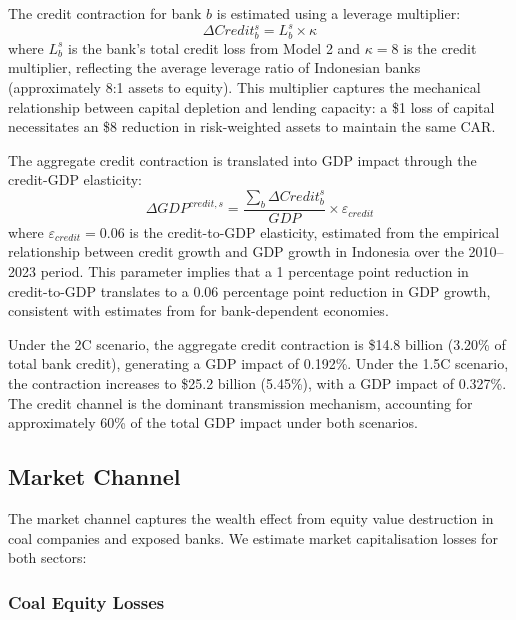 The credit contraction for bank $b$ is estimated using a leverage multiplier:
\begin{equation}
\label{eq:credit_contraction}
\Delta Credit_b^s = L_b^s \times \kappa
\end{equation}
where $L_b^s$ is the bank's total credit loss from Model 2 and $\kappa = 8$ is the credit multiplier, reflecting the average leverage ratio of Indonesian banks (approximately 8:1 assets to equity). This multiplier captures the mechanical relationship between capital depletion and lending capacity: a \$1 loss of capital necessitates an \$8 reduction in risk-weighted assets to maintain the same CAR.

The aggregate credit contraction is translated into GDP impact through the credit-GDP elasticity:
\begin{equation}
\label{eq:credit_gdp}
\Delta GDP^{credit,s} = \frac{\sum_b \Delta Credit_b^s}{GDP} \times \varepsilon_{credit}
\end{equation}
where $\varepsilon_{credit} = 0.06$ is the credit-to-GDP elasticity, estimated from the empirical relationship between credit growth and GDP growth in Indonesia over the 2010--2023 period. This parameter implies that a 1 percentage point reduction in credit-to-GDP translates to a 0.06 percentage point reduction in GDP growth, consistent with estimates from \citet{GambacortaMarques2011} for bank-dependent economies.

Under the 2\textdegree C scenario, the aggregate credit contraction is \$14.8 billion (3.20\% of total bank credit), generating a GDP impact of 0.192\%. Under the 1.5\textdegree C scenario, the contraction increases to \$25.2 billion (5.45\%), with a GDP impact of 0.327\%. The credit channel is the dominant transmission mechanism, accounting for approximately 60\% of the total GDP impact under both scenarios.

\subsection{Market Channel}
\label{subsec:market_channel}

The market channel captures the wealth effect from equity value destruction in coal companies and exposed banks. We estimate market capitalisation losses for both sectors:

\subsubsection{Coal Equity Losses}

